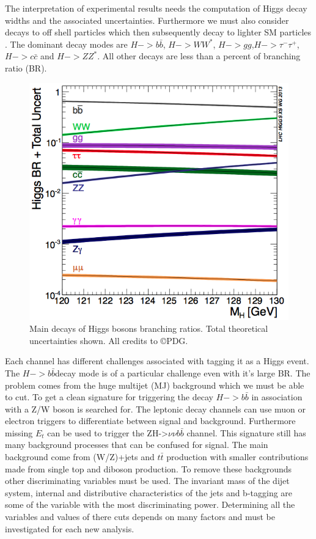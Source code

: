 The interpretation of experimental results needs the computation of Higgs decay widths and the associated uncertainties. Furthermore we must also consider decays to off shell particles which then subsequently decay to lighter SM particles \cite{pdg}. The dominant decay modes are $H->b\bar{b}$, $H->WW^*$, $H->gg$,$H->\tau^{-}\tau^{+}$,$H->c\bar{c}$ and $H->ZZ^*$. All other decays are less than a percent of branching ratio (BR).

\begin{figure}[!H]
\centering
\includegraphics[scale=0.5]{figures/Decays.png}
\caption{Main decays of Higgs bosons branching ratios. Total theoretical uncertainties shown. All credits to \copyright PDG.}
\label{fig:decays}
\end{figure}

Each channel has different challenges associated with tagging it as a Higgs event. The $H->b\bar{b}$decay mode is of a particular challenge even with it's large BR. The problem comes from the huge multijet (MJ) background which we must be able to cut\cite{higgsBB}. To get a clean signature for triggering the decay $H->b\bar{b}$ in association with a Z/W boson is searched for. The leptonic decay channels can use muon or electron triggers to differentiate between signal and background. Furthermore missing $E_t$ can be used to trigger the ZH->$\nu\nu b\bar{b}$ channel. This signature still has many background processes that can be confused for signal. The main background come from (W/Z)+jets and $t\bar{t}$ production with smaller contributions made from single top and diboson production. To remove these backgrounds other discriminating variables must be used. The invariant mass of the dijet system, internal and distributive characteristics of the jets and b-tagging are some of the variable with the most discriminating power. Determining all the variables and values of there cuts depends on many factors and must be investigated for each new analysis.           


